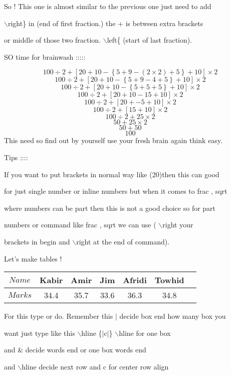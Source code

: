 \documentclass[11pt]{article}
\begin{document}
So ! This one is almost similar to the previous one just need to add

   $\backslash$right\} in (end of first fraction.) the + is between extra brackets
   
or middle of those two fraction. $\backslash$left\{ (start of last fraction).

SO time for brainwash :::::

$$100\div2+\left[ 20+10-\left\{5+9-\left(2\times2\right)+5\right\}+10\right]\times2$$
$$100\div2+\left[ 20+10-\left\{5+9-4+5\right\}+10\right]\times2$$
$$100\div2+\left[ 20+10-\left\{5+5+5\right\}+10\right]\times2$$
$$100\div2+\left[ 20+10-15+10\right]\times2$$
$$100\div2+\left[ 20+-5+10\right]\times2$$
$$100\div2+\left[ 15+10\right]\times2$$
$$100\div2+25\times2$$
$$50+25\times2$$
$$50+50$$
$$100$$
This need so find out by yourself use your fresh brain again think easy.
\vspace{1cm}

Tips ::::

If you want to put brackets in normal way like (20)then this can good 

for just single number or inline numbers but when it comes to frac , sqrt 

where numbers can be part then this is not a good choice so for part 

numbers or command like frac , sqrt we can use ( $\backslash$right your 

brackets in begin and $\backslash$right at the end of command).

\pagebreak

Let's make tables !
\vspace{1cm}

\begin{tabular}{|c||c|c|c|c|c|c|}
\hline
$Name$ & Kabir & Amir & Jim & Afridi & Towhid \\ \hline
$Marks$ & 34.4 & 35.7 & 33.6 & 36.3 & 34.8 \\ \hline

\end{tabular}
\vspace{1cm}

For this type or do. Remember this $ | $ decide box end how many box you 

want just type like this $\backslash$hline \{$|$c$|$\} $\backslash$hline for one box

and \& decide words end or one box words end

and $\backslash$hline decide next row and c for center row align
\end{document}

